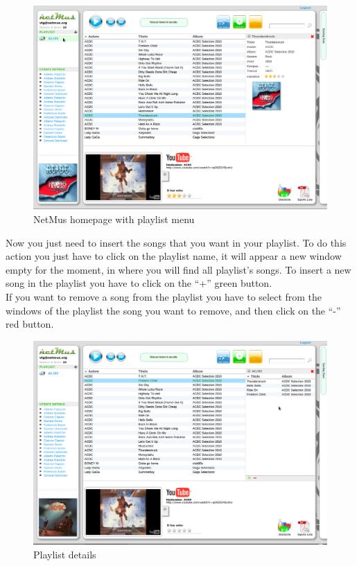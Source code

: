 \begin{figure}[htbp]
  \centering
  \includegraphics[width=15cm]{img/MU/new_playlist.png}
\caption{NetMus homepage with playlist menu}
\end{figure}

Now you just need to insert the songs that you want in your playlist. To do this
action you just have to click on the playlist name, it will appear a new window
empty for the moment, in where you will find all playlist's songs. To insert a
new song in the playlist you have to click on the ``+'' green button.\\
If you want to remove a song from the playlist you have to select from the
windows of the playlist the song you want to remove, and then click on the ``-''
red button.\\

\begin{figure}[htbp]
  \centering
  \includegraphics[width=15cm]{img/MU/playlist_song.png}
\caption{Playlist details}
\end{figure}

